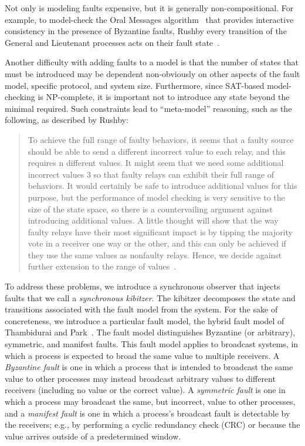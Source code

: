 \documentclass{IEEEtran/IEEEtran}
\begin{document}
Not only is modeling faults expensive, but it is generally non-compositional. For example, to model-check the Oral Messages algorithm~\cite{} that provides interactive consistency in the presence of Byzantine faults, Rushby every transition of the General and Lieutenant processes acts on their fault state~\cite{}.

Another difficulty with adding faults to a model is that the number of states that must be introduced may be dependent non-obviously on other aspects of the fault model, specific protocol, and system size. Furthermore, since SAT-based model-checking is NP-complete, it is important not to introduce any state beyond the minimal required. Such constraints lead to ``meta-model'' reasoning, such as the following, as described by Rushby:

\begin{quote}
To achieve the full range of faulty behaviors, it seems that a faulty source should be able to send a different incorrect value to each relay, and this requires n different values. It might seem that we need some additional incorrect values 3 so that faulty relays can exhibit their full range of behaviors. It would certainly be safe to introduce additional values for this purpose, but the performance of model checking is very sensitive to the size of the state space, so there is a countervailing argument against introducing additional values. A little thought will show that the way faulty relays have their most significant impact is by tipping the majority vote in a receiver one way or the other, and this can only be achieved if they use the same values as nonfaulty relays. Hence, we decide against further extension to the range of values~\cite{}.
\end{quote}

To address these problems, we introduce a synchronous observer that injects faults that we call a \emph{synchronous kibitzer}. The kibitzer decomposes the state and transitions associated with the fault model from the system. For the sake of concreteness, we introduce a particular fault model, the hybrid fault model of Thambidurai and Park~\cite{}. The fault model distinguishes Byzantine (or arbitrary), symmetric, and manifest faults. This fault model applies to broadcast systems, in which a process is expected to broad the same value to multiple receivers. A \emph{Byzantine fault} is one in which a process that is intended to broadcast the same value to other processes may instead broadcast arbitrary values to different receivers (including no value or the correct value). A \emph{symmetric fault} is one in which a process may broadcast the same, but incorrect, value to other processes, and a \emph{manifest fault} is one in which a process's broadcast fault is detectable by the receivers; e.g., by performing a cyclic redundancy check (CRC) or because the value arrives outside of a predetermined window.
\end{document}
